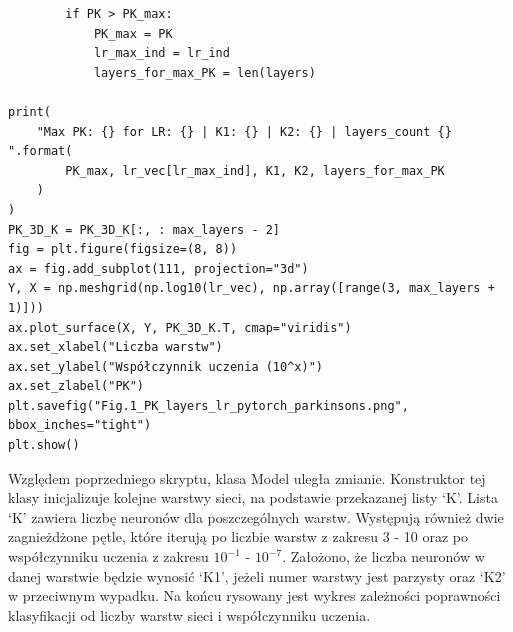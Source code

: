\documentclass{article}
\begin{document}
\begin{verbatim}
        if PK > PK_max:
            PK_max = PK
            lr_max_ind = lr_ind
            layers_for_max_PK = len(layers)

print(
    "Max PK: {} for LR: {} | K1: {} | K2: {} | layers_count {} ".format(
        PK_max, lr_vec[lr_max_ind], K1, K2, layers_for_max_PK
    )
)
PK_3D_K = PK_3D_K[:, : max_layers - 2]
fig = plt.figure(figsize=(8, 8))
ax = fig.add_subplot(111, projection="3d")
Y, X = np.meshgrid(np.log10(lr_vec), np.array([range(3, max_layers + 1)]))
ax.plot_surface(X, Y, PK_3D_K.T, cmap="viridis")
ax.set_xlabel("Liczba warstw")
ax.set_ylabel("Współczynnik uczenia (10^x)")
ax.set_zlabel("PK")
plt.savefig("Fig.1_PK_layers_lr_pytorch_parkinsons.png", bbox_inches="tight")
plt.show()
\end{verbatim}

Względem poprzedniego skryptu, klasa Model uległa zmianie.
Konstruktor tej klasy inicjalizuje kolejne warstwy sieci, na podstawie przekazanej listy `K'.
Lista `K' zawiera liczbę neuronów dla poszczególnych warstw.
Występują również dwie zagnieżdżone pętle, które iterują po liczbie warstw z zakresu 3 - 10 oraz po współczynniku uczenia z zakresu $10^{-1}$ - $10^{-7}$.
Założono, że liczba neuronów w danej warstwie będzie wynosić `K1', jeżeli numer warstwy jest parzysty oraz `K2' w przeciwnym wypadku.
Na końcu rysowany jest wykres zależności poprawności klasyfikacji od liczby warstw sieci i współczynniku uczenia.
\end{document}
